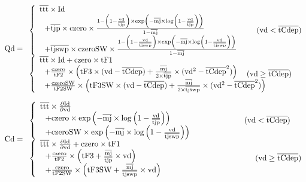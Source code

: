 \[
\rm{Qd} =
\begin{array}{l l}
	\left\{
	\begin{array}{l l}	
	\rm{\overline{ttt}\times Id \nonumber} \\
	\rm{\ \ +\overline{tjp}\times czero\times \frac{1-\left(1-\frac{vd}{\overline{tjp}}\right)\times \exp\left(-\overline{mj}\times\log\left(1-\frac{vd}{\overline{tjp}}\right)\right)}{1-\overline{mj}}\nonumber} \\
	\rm{\ \ +\overline{tjswp}\times czeroSW\times \frac{1-\left(1-\frac{vd}{\overline{tjswp}}\right)\times \exp\left(-\overline{mj}\times\log\left(1-\frac{vd}{\overline{tjswp}}\right)\right)}{1-\overline{mj}}\nonumber}
	\end{array}
	\right.\nonumber \hspace{0.2in} \rm{\ (vd<\overline{tCdep})}\\
	\left\{
	\begin{array}{l l}	
	\rm{\overline{ttt}\times Id + czero\times tF1 \nonumber} \\
	\rm{\ \ +\frac{czero}{tF2}\times\left(tF3\times(vd-\overline{tCdep})+\frac{\overline{mj}}{2\times \overline{tjp}}\times(vd^2-\overline{tCdep}^2)\right)} \nonumber \\
	\rm{\ \ +\frac{czeroSW}{tF2SW}\times\left(tF3SW\times(vd-\overline{tCdep})+\frac{\overline{mj}}{2\times \overline{tjswp}}\times(vd^2-\overline{tCdep}^2)\right)} \nonumber	
	\end{array}
	\right.\nonumber \hspace{-0.5in} \rm{\ (vd\geq \overline{tCdep})}		
\end{array}
\]


\[
\rm{Cd} =
\begin{array}{l l}
	\left\{
	\begin{array}{l l}	
	\rm{\overline{ttt}\times \frac{\partial Id}{\partial vd} \nonumber} \\
	\rm{\ \ +czero\times\exp\left(-\overline{mj}\times\log\left(1-\frac{vd}{\overline{tjp}}\right)\right)\nonumber} \\
	\rm{\ \ +czeroSW\times \exp\left(-\overline{mj}\times\log\left(1-\frac{vd}{\overline{tjswp}}\right)\right)\nonumber}
	\end{array}
	\right.\nonumber \hspace{0.8in} \rm{\ (vd<\overline{tCdep})}\\
	\left\{
	\begin{array}{l l}	
	\rm{\overline{ttt}\times \frac{\partial Id}{\partial vd} + czero\times tF1 \nonumber} \\
	\rm{\ \ +\frac{czero}{tF2}\times\left(tF3+\frac{\overline{mj}}{\overline{tjp}}\times vd\right)} \nonumber \\
	\rm{\ \ +\frac{czero}{tF2SW}\times\left(tF3SW+\frac{\overline{mj}}{\overline{tjswp}}\times vd\right)} \nonumber	
	\end{array}
	\right.\nonumber \hspace{1.5in} \rm{\ (vd\geq \overline{tCdep})}		
\end{array}
\]

